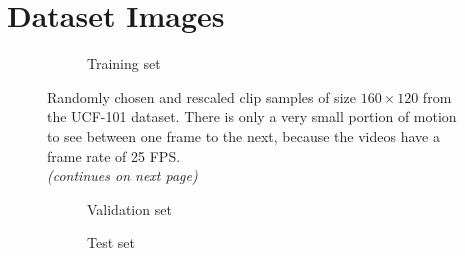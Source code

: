
 \label{chapter:appendix}

\section{Dataset Images}

\begin{figure}[h!tb]
\centering
\begin{subfigure}{1.0\textwidth}
  \centering
  \caption{Training set}
  \label{fig:ucf_train_full}
  \vspace{.1cm}
\end{subfigure}
\caption[UCF-101 Full Image Samples]{Randomly chosen and rescaled clip samples of size $160 \times 120$ from the UCF-101 dataset. There is only a very small portion of motion to see between one frame to the next, because the videos have a frame rate of \num{25} FPS.\\
\textit{(continues on next page)}}
\label{fig:ucf_full}
\end{figure}

\begin{figure}[h!tb]
\ContinuedFloat %
\centering
\begin{subfigure}{1.0\textwidth}
  \centering
  \caption{Validation set}
  \label{fig:ucf_valid_full}
  \vspace{.1cm}
\end{subfigure}
\begin{subfigure}{1.0\textwidth}
  \centering
  \caption{Test set}
  \label{fig:ucf_test_full}
\end{subfigure}
\caption*{}
\end{figure}


